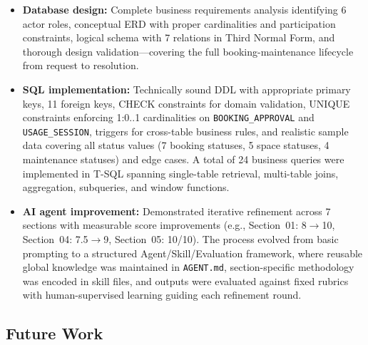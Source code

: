 \begin{itemize}
    \item \textbf{Database design:} Complete business requirements analysis identifying 6 actor roles, conceptual ERD with proper cardinalities and participation constraints, logical schema with 7 relations in Third Normal Form, and thorough design validation---covering the full booking-maintenance lifecycle from request to resolution.

    \item \textbf{SQL implementation:} Technically sound DDL with appropriate primary keys, 11 foreign keys, CHECK constraints for domain validation, UNIQUE constraints enforcing 1:0..1 cardinalities on \texttt{BOOKING\_APPROVAL} and \texttt{USAGE\_SESSION}, triggers for cross-table business rules, and realistic sample data covering all status values (7 booking statuses, 5 space statuses, 4 maintenance statuses) and edge cases. A total of 24 business queries were implemented in T-SQL spanning single-table retrieval, multi-table joins, aggregation, subqueries, and window functions.

    \item \textbf{AI agent improvement:} Demonstrated iterative refinement across 7 sections with measurable score improvements (e.g., Section~01: 8$\rightarrow$10, Section~04: 7.5$\rightarrow$9, Section~05: 10/10). The process evolved from basic prompting to a structured Agent/Skill/Evaluation framework, where reusable global knowledge was maintained in \texttt{AGENT.md}, section-specific methodology was encoded in skill files, and outputs were evaluated against fixed rubrics with human-supervised learning guiding each refinement round.
\end{itemize}


\subsection{Future Work}

